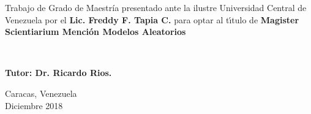 \vspace{2cm}

\hspace{6cm}
\begin{minipage}[t]{9cm}
Trabajo de Grado de Maestr\'ia presentado ante la ilustre Universidad Central de Venezuela por el
\textbf{Lic. Freddy F. Tapia C.} para optar al t\'{\i}tulo de \textbf{Magister Scientiarium Menci\'on Modelos Aleatorios}

\

\textbf{Tutor: Dr. Ricardo Rios.}
\end{minipage}



\vspace{1.5cm}

\begin{center}
Caracas, Venezuela \\
Diciembre 2018
\end{center}

\newpage
